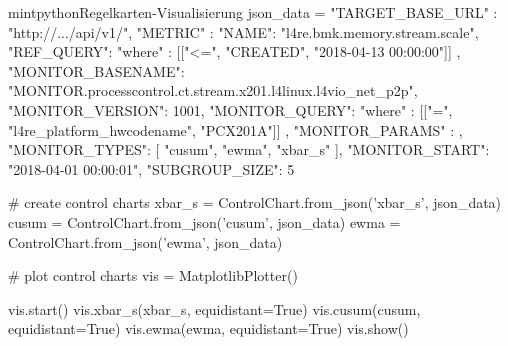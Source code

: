 \begin{mintlisting}[label=lst:control_charts]{mintpython}{Regelkarten-Visualisierung}
json_data = {
    "TARGET_BASE_URL" : "http://.../api/v1/",
    "METRIC" : {
        "NAME": "l4re.bmk.memory.stream.scale",
        "REF_QUERY": {
           "where" : [["<=", "CREATED", "2018-04-13 00:00:00"]]
        },
        "MONITOR_BASENAME": "MONITOR.processcontrol.ct.stream.x201.l4linux.l4vio_net_p2p",
        "MONITOR_VERSION": 1001,
        "MONITOR_QUERY": {
            "where" : [["=", "l4re_platform_hwcodename", "PCX201A"]]
        },
        "MONITOR_PARAMS" : {},
        "MONITOR_TYPES": [
            "cusum",
            "ewma",
            "xbar_s"
        ],
        "MONITOR_START": "2018-04-01 00:00:01",
        "SUBGROUP_SIZE": 5
    }
}

# create control charts
xbar_s = ControlChart.from_json('xbar_s', json_data)
cusum = ControlChart.from_json('cusum', json_data)
ewma = ControlChart.from_json('ewma', json_data)

# plot control charts
vis = MatplotlibPlotter()

vis.start()
vis.xbar_s(xbar_s, equidistant=True)
vis.cusum(cusum, equidistant=True)
vis.ewma(ewma, equidistant=True)
vis.show()
\end{mintlisting}

